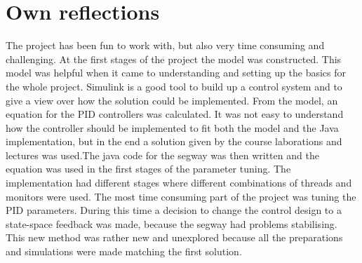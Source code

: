 \documentclass[a4paper]{article}
\begin{document}
\section{Own reflections}
The project has been fun to work with, but also very time consuming and challenging. At the first stages of the project the model was constructed. This model was helpful when it came to understanding and setting up the basics for the whole project. Simulink is a good tool to build up a control system and to give a view over how the solution could be implemented. From the model, an equation for the PID controllers was calculated. It was not easy to understand how the controller should be implemented to fit both the model and the Java implementation, but in the end a solution given by the course laborations and lectures was used.The java code for the segway was then written and the equation was used in the first stages of the parameter tuning. The implementation had different stages where different combinations of threads and monitors were used. The most time consuming part of the project was tuning the PID parameters. During this time a decision to change the control design to a state-space feedback was made, because the segway had problems stabilising. This new method was rather new and unexplored because all the preparations and simulations were made matching the first solution.
\end{document}
